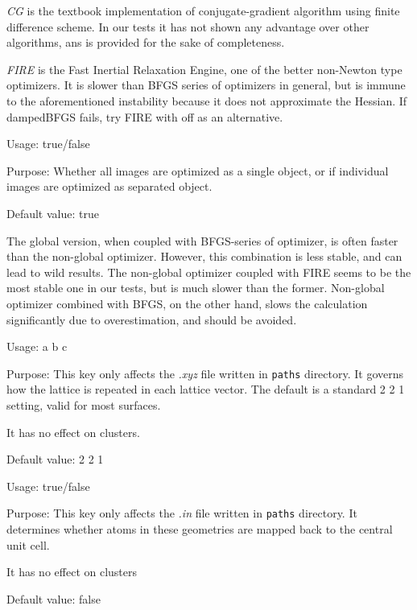 \textit{CG} is the textbook implementation of conjugate-gradient algorithm using finite difference scheme. In our tests it has not shown any advantage over other algorithms, ans is provided for the sake of completeness. 

\textit{FIRE} is the Fast Inertial Relaxation Engine, one of the better non-Newton type optimizers. It is slower than BFGS series of optimizers in general, but is immune to the aforementioned instability because it does not approximate the Hessian. If dampedBFGS fails, try FIRE with  off as an alternative. 

{
Usage:  true/false


Purpose: Whether all images are optimized as a single object, or if individual images are optimized as separated object. 


Default value: true
}
The global version, when coupled with BFGS-series of optimizer, is often faster than the non-global optimizer. However, this combination is less stable, and can lead to wild results. The non-global optimizer coupled with FIRE seems to be the most stable one in our tests, but is much slower than the former. Non-global optimizer combined with BFGS, on the other hand, slows the calculation significantly due to overestimation, and should be avoided. 

{
Usage:  a b c


Purpose: This key only affects the \textit{.xyz} file written in \texttt{paths} directory. It governs how the lattice is repeated in each lattice vector. The default is a standard 2 2 1 setting, valid for most surfaces. 

It has no effect on clusters. 


Default value: 2 2 1
}

{
Usage:  true/false


Purpose: This key only affects the \textit{.in} file written in \texttt{paths} directory. It determines whether atoms in these geometries are mapped back to the central unit cell. 

It has no effect on clusters

Default value: false
}


